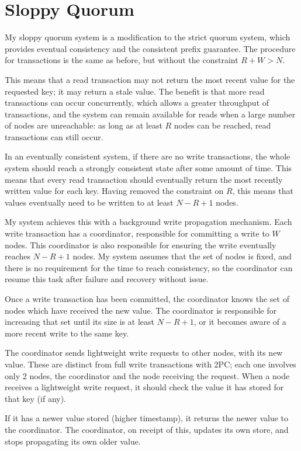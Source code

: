 \documentclass[12pt,a4paper,twoside,openany]{report}
\begin{document}
\section{Sloppy Quorum}

My sloppy quorum system is a modification to the strict quorum system, which provides eventual consistency and the consistent prefix guarantee. The procedure for transactions is the same as before, but without the constraint $R + W > N$.

This means that a read transaction may not return the most recent value for the requested key; it may return a stale value. The benefit is that more read transactions can occur concurrently, which allows a greater throughput of transactions, and the system can remain available for reads when a large number of nodes are unreachable: as long as at least $R$ nodes can be reached, read transactions can still occur.

In an eventually consistent system, if there are no write transactions, the whole system should reach a strongly consistent state after some amount of time. This means that every read transaction should eventually return the most recently written value for each key. Having removed the constraint on $R$, this means that values eventually need to be written to at least $N - R + 1$ nodes.

My system achieves this with a background write propagation mechanism. Each write transaction has a coordinator, responsible for committing a write to $W$ nodes. This coordinator is also responsible for ensuring the write eventually reaches $N - R + 1$ nodes. My system assumes that the set of nodes is fixed, and there is no requirement for the time to reach consistency, so the coordinator can resume this task after failure and recovery without issue.

Once a write transaction has been committed, the coordinator knows the set of nodes which have received the new value. The coordinator is responsible for increasing that set until its size is at least $N - R + 1$, or it becomes aware of a more recent write to the same key.

The coordinator sends lightweight write requests to other nodes, with its new value. These are distinct from full write transactions with 2PC; each one involves only 2 nodes, the coordinator and the node receiving the request. When a node receives a lightweight write request, it should check the value it has stored for that key (if any).

If it has a newer value stored (higher timestamp), it returns the newer value to the coordinator. The coordinator, on receipt of this, updates its own store, and stops propagating its own older value.
\end{document}
